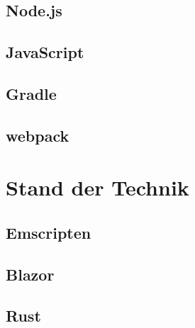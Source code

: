 \subsection{Node.js}
\subsection{JavaScript}
\subsection{Gradle}
\subsection{webpack}

\section{Stand der Technik}
\subsection{Emscripten}
\subsection{Blazor}
\subsection{Rust}
